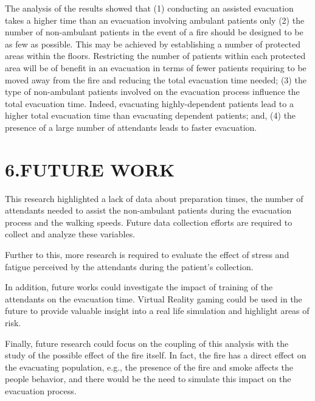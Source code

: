 \documentclass{style/llncs}
\begin{document}
The analysis of the results showed that (1) conducting an assisted evacuation
 takes a higher time than an evacuation involving ambulant patients only (2) 
 the number of non-ambulant patients in the event of a fire should be designed 
 to be as few as possible. This may be achieved by establishing a number of 
 protected areas within the floors. Restricting the number of patients within
  each protected area will be of benefit in an evacuation in terms of fewer 
  patients requiring to be moved away from the fire and reducing the total
   evacuation time needed; (3) the type of non-ambulant patients involved
    on the evacuation process influence the total evacuation time. Indeed, 
    evacuating highly-dependent patients lead to a higher total evacuation 
    time than evacuating dependent patients; and, (4) the presence of a
     large number of attendants leads to faster evacuation.%

\section{6.\hspace*{0.5em}FUTURE WORK}\label{sec-future-work}%

\noindent{}This research highlighted a lack of data about preparation times, the
number of attendants needed to assist the non-ambulant patients during
the evacuation process and the walking speeds. Future data collection
efforts are required to collect and analyze these variables.%

Further to this, more research is required to evaluate the effect of
stress and fatigue perceived by the attendants during the patient's
collection.%

In addition, future works could investigate the impact of training of the
attendants on the evacuation time. Virtual Reality gaming could be used
in the future to provide valuable insight into a real life simulation and
highlight areas of risk.%

Finally, future research could focus on the coupling of this analysis
with the study of the possible effect of the fire itself. In fact, the
fire has a direct effect on the evacuating population, e.g., the presence
of the fire and smoke affects the people behavior, and there would be
the need to simulate this impact on the evacuation process.%
\end{document}

